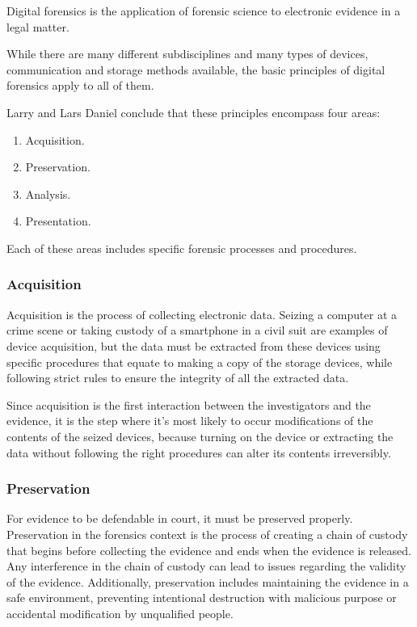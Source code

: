 Digital forensics is the application of forensic science to electronic evidence in a
legal matter.

While there are many different subdisciplines and many types of devices, communication
and storage methods available, the basic principles of digital forensics
apply to all of them.

Larry and Lars Daniel \cite{daniels} conclude that these principles encompass four areas:

\begin{enumerate}
\item Acquisition.
\item Preservation.
\item Analysis.
\item Presentation.
\end{enumerate}

Each of these areas includes specific forensic processes and procedures.

\subsubsection*{Acquisition}

Acquisition is the process of collecting electronic data. Seizing a computer at a crime scene or
taking custody of a smartphone in a civil suit are examples of device acquisition, but the data 
must be extracted from these devices using specific procedures that equate to making a copy of
the storage devices, while following strict rules to ensure the integrity of all the extracted data.

Since acquisition is the first interaction between the investigators and the evidence,
it is the step where it's most likely to occur modifications of the contents of the seized devices,
because turning on the device or extracting the data without following the right procedures can alter
its contents irreversibly.

\subsubsection*{Preservation}

For evidence to be defendable in court, it must be preserved properly.
Preservation in the forensics context is the process of creating a chain of custody \cite{custody}
that begins before collecting the evidence and ends when the evidence is released.
Any interference in the chain of custody can lead to issues regarding the validity of the evidence.
Additionally, preservation includes maintaining the evidence in a safe environment, preventing
intentional destruction with malicious purpose or accidental modification by unqualified people.

